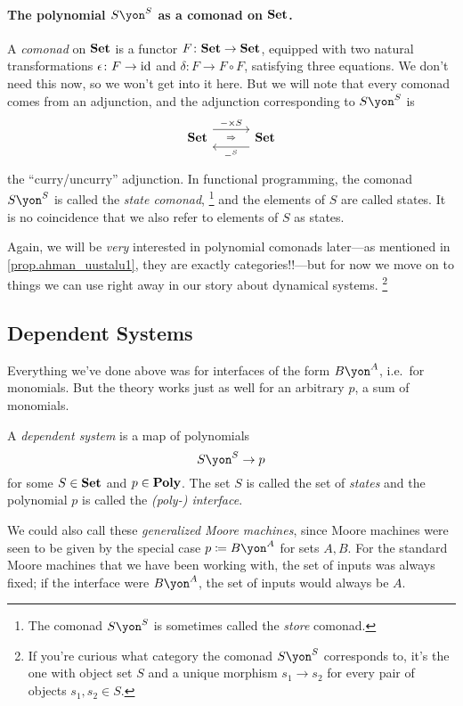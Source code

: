 \documentclass[Book-Poly]{subfiles}
\begin{document}
\paragraph{The polynomial $S\yon^S$ as a comonad on $\mathbf{Set}$.}\label{page.poly_comonad}

A \emph{comonad} on $\mathbf{Set}$ is a functor $F\colon\mathbf{Set}\to\mathbf{Set}$, equipped with two natural transformations $\epsilon\colon F\to\mathrm{id}$ and $\delta\colon F\to F\circ F$, satisfying three equations. We don't need this now, so we won't get into it here. But we will note that every comonad comes from an adjunction, and the adjunction corresponding to $S\yon^S$ is
\[
\adj{\smset}{-\times S}{-^S}{\smset}
\]
the ``curry/uncurry'' adjunction. In functional programming, the comonad $S\yon^S$ is called the \emph{state comonad},%
\footnote{The comonad $S\yon^S$ is sometimes called the \emph{store} comonad.} 
and the elements of $S$ are called states.  It is no coincidence that we also refer to elements of $S$ as states. 

Again, we will be \emph{very} interested in polynomial comonads later---as mentioned in \cref{prop.ahman_uustalu1}, they are exactly categories!!---but for now we move on to things we can use right away in our story about dynamical systems.%
\footnote{If you're curious what category the comonad $S\yon^S$ corresponds to, it's the one with object set $S$ and a unique morphism $s_1\to s_2$ for every pair of objects $s_1,s_2\in S$.}

\subsection{Dependent Systems}

Everything we've done above was for interfaces of the form $B\yon^A$, i.e.\ for monomials. But the theory works just as well for an arbitrary $p$, a sum of monomials.

\begin{definition}\label{def.gen_moore}
A \emph{dependent system} is a map of polynomials
\[S\yon^S\to p\]
for some $S\in\mathbf{Set}$ and $p\in\mathbf{Poly}$. The set $S$ is called the set of \emph{states} and the polynomial $p$ is called the \emph{(poly-) interface}.
\end{definition}

We could also call these \emph{generalized Moore machines}, since Moore machines were seen to be given by the special case $p\coloneqq B\yon^A$ for sets $A,B$.
For the standard Moore machines that we have been working with, the set of inputs was always fixed; if the interface were $B\yon^A$, the set of inputs would always be $A$.
\end{document}
